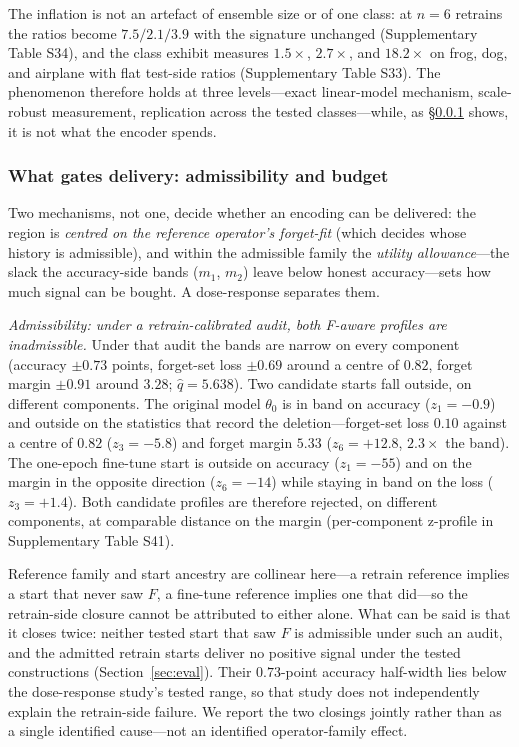 \documentclass[lettersize,journal]{IEEEtran}
\begin{document}
The inflation is not an artefact of ensemble size or of one
class: at $n{=}6$ retrains the ratios become $7.5/2.1/3.9$ with
the signature unchanged (Supplementary Table S34), and the
class exhibit measures $1.5\times$, $2.7\times$, and
$18.2\times$ on frog, dog, and airplane with flat test-side
ratios (Supplementary Table S33). The phenomenon therefore
holds at three levels---exact linear-model mechanism,
scale-robust measurement, replication across the tested
classes---while, as \S\ref{sec:allowance} shows, it is not
what the encoder spends.


\subsubsection{What gates delivery: admissibility and budget}
\label{sec:allowance}

Two mechanisms, not one, decide whether an encoding can be
delivered: the region is \emph{centred on the reference
operator's forget-fit} (which decides whose history is
admissible), and within the admissible family the
\emph{utility allowance}---the slack the accuracy-side bands
($m_1$, $m_2$) leave below honest accuracy---sets how much
signal can be bought. A dose-response separates them.

\emph{Admissibility: under a retrain-calibrated audit, both
F-aware profiles are inadmissible.} Under that audit the bands are narrow
on every component (accuracy $\pm0.73$ points, forget-set loss
$\pm0.69$ around a centre of $0.82$, forget margin $\pm0.91$
around $3.28$; $\hat q{=}5.638$). Two candidate starts fall
outside, on different components. The original model $\theta_0$
is in band on accuracy ($z_1=-0.9$) and outside on the
statistics that record the deletion---forget-set loss $0.10$
against a centre of $0.82$ ($z_3=-5.8$) and forget margin
$5.33$ ($z_6=+12.8$, $2.3\times$ the band). The one-epoch
fine-tune start is outside on accuracy ($z_1=-55$) and on the
margin in the opposite direction ($z_6=-14$) while staying in
band on the loss ($z_3=+1.4$). Both candidate profiles are
therefore rejected, on different components, at comparable
distance on the margin (per-component z-profile in
Supplementary Table S41).

Reference family and start ancestry are collinear here---a
retrain reference implies a start that never saw $F$, a
fine-tune reference implies one that did---so the retrain-side
closure cannot be attributed to either alone. What can be said
is that it closes twice: neither tested start that saw $F$ is
admissible under such an audit, and the admitted retrain
starts deliver no positive signal under the tested
constructions (Section~\ref{sec:eval}). Their $0.73$-point
accuracy half-width lies below the dose-response study's
tested range, so that study does not independently explain
the retrain-side failure. We report the two closings jointly
rather than as a single identified cause---not an identified
operator-family effect.
\end{document}
